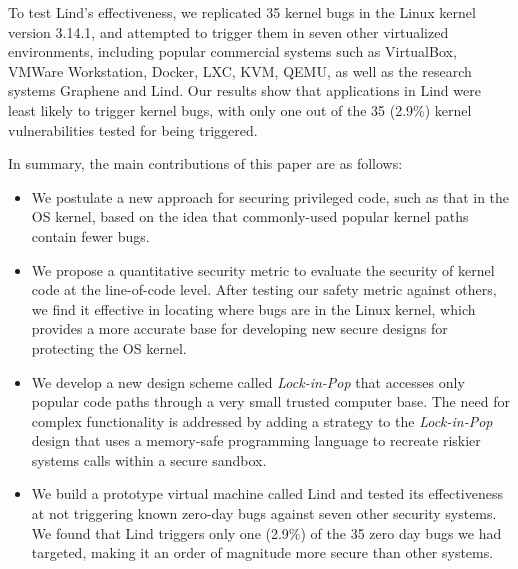 To test Lind's effectiveness, we replicated 35 kernel bugs in the Linux kernel version 3.14.1, 
and attempted to trigger them in seven other virtualized environments, 
including popular commercial systems such as VirtualBox, VMWare Workstation, 
Docker, LXC, KVM, QEMU, as well as the research systems Graphene and Lind. 
Our results show that applications in Lind were least likely to trigger kernel bugs, 
with only one out of the 35 (2.9\%) kernel vulnerabilities tested for being triggered.

In summary, the main contributions of this paper are as follows:

\begin{itemize}\setlength\itemsep{0em}
\item
We postulate a new approach for securing privileged code, 
such as that in the OS kernel, based on the idea that commonly-used popular kernel paths contain fewer bugs. 

\item
We propose a quantitative security metric to evaluate the security of kernel code at the line-of-code level. 
After testing our safety metric against others, we find it effective in locating where bugs are in the Linux kernel, 
which provides a more accurate base for developing new secure designs for protecting the OS kernel.

\item
We develop a new design scheme called \emph{Lock-in-Pop} that accesses only popular code paths 
through a very small trusted computer base. 
The need for complex functionality is addressed by adding a strategy to the \emph{Lock-in-Pop} design that 
uses a memory-safe programming language to recreate riskier systems calls within a secure sandbox. 

\item
We build a prototype virtual machine called Lind and tested its effectiveness at not triggering known zero-day bugs 
against seven other security systems. We found that Lind triggers only one (2.9\%) of the 35 zero day bugs we had targeted, 
making it an order of magnitude more secure than other systems.
\end{itemize}


